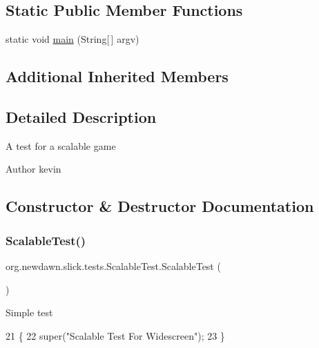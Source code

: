 \subsection*{Static Public Member Functions}
\begin{DoxyCompactItemize}
\item 
static void \mbox{\hyperlink{classorg_1_1newdawn_1_1slick_1_1tests_1_1_scalable_test_a7927b211d5081c26b6cfc9909851c365}{main}} (String\mbox{[}$\,$\mbox{]} argv)
\end{DoxyCompactItemize}
\subsection*{Additional Inherited Members}


\subsection{Detailed Description}
A test for a scalable game

\begin{DoxyAuthor}{Author}
kevin 
\end{DoxyAuthor}


\subsection{Constructor \& Destructor Documentation}
\mbox{\label{classorg_1_1newdawn_1_1slick_1_1tests_1_1_scalable_test_a9ca75a0468482f8eb516d1f4814f29f2}} 
\subsubsection{\texorpdfstring{Scalable\+Test()}{ScalableTest()}}
{\footnotesize\ttfamily org.\+newdawn.\+slick.\+tests.\+Scalable\+Test.\+Scalable\+Test (\begin{DoxyParamCaption}{ }\end{DoxyParamCaption})\hspace{0.3cm}{\ttfamily [inline]}}

Simple test 
\begin{DoxyCode}
21                           \{
22         super(\textcolor{stringliteral}{"Scalable Test For Widescreen"});
23     \}
\end{DoxyCode}


